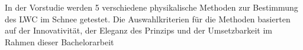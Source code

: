 
In der Vorstudie werden 5 verschiedene physikalische Methoden zur Bestimmung des LWC im Schnee getestet. Die Auswahlkriterien für die Methoden basierten auf der Innovativität, der Eleganz des Prinzips und der Umsetzbarkeit im Rahmen dieser Bachelorarbeit
